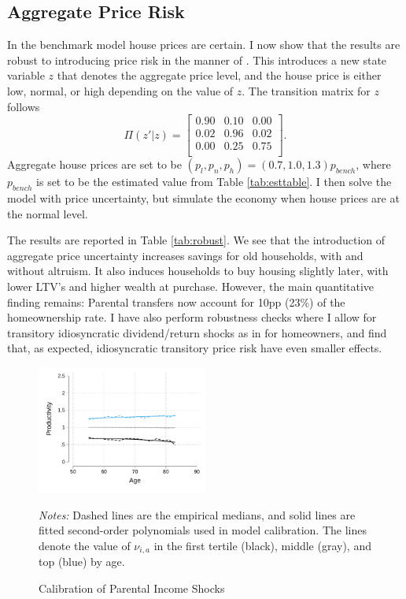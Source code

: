\documentclass[12pt]{article}
\begin{document}
\subsection{Aggregate Price Risk}\label{sec:robust_pricerisk}
In the benchmark model house prices are certain. I now show that the results are robust to introducing price risk in the manner of \cite{Corbae2015}. This introduces a new state variable $z$ that denotes the aggregate price level, and the house price is either low, normal, or high depending on the value of $z$. The transition matrix for $z$ follows 
\begin{equation}
\Pi(z'|z) = \begin{bmatrix}
0.90 & 0.10 & 0.00 \\
0.02 & 0.96 & 0.02 \\
0.00 & 0.25 & 0.75 \\
\end{bmatrix}.
\end{equation}
Aggregate house prices are set to be $(p_l,p_n,p_h)=(0.7,1.0,1.3)p_{bench}$, where $p_{bench}$ is set to be the estimated value from Table \ref{tab:esttable}. I then solve the model with price uncertainty, but simulate the economy when house prices are at the normal level. 

The results are reported in Table \ref{tab:robust}. We see that the introduction of aggregate price uncertainty increases savings for old households, with and without altruism. It also induces households to buy housing slightly later, with lower LTV's and higher wealth at purchase. However, the main quantitative finding remains: Parental transfers now account for 10pp (23\%) of the homeownership rate. I have also perform robustness checks where I allow for transitory idiosyncratic dividend/return shocks as in \cite{Chang2024} for homeowners, and find that, as expected, idiosyncratic transitory price risk have even smaller effects.



\begin{figure}
    \caption{Calibration of Parental Income Shocks}\label{fig:nu}
	{\centering
    \includegraphics[width=0.5\textwidth]{../tabfig/empirical/lifecycleproductivity_old_3}
    \par}    {\begin{footnotesize} \textit{Notes:}
        Dashed lines are the empirical medians, and solid lines are fitted second-order polynomials used in model calibration. The lines denote the value of $\nu_{i,a}$ in the first tertile (black), middle (gray), and top (blue) by age.
    \end{footnotesize}}
\end{figure}
\end{document}
